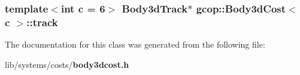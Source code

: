 \subsubsection[{track}]{\setlength{\rightskip}{0pt plus 5cm}template$<$int c = 6$>$ {\bf \-Body3d\-Track}$\ast$ {\bf gcop\-::\-Body3d\-Cost}$<$ c $>$\-::{\bf track}}\label{classgcop_1_1Body3dCost_abb852e8abe5fbe2ec179981ca765a786}


\-The documentation for this class was generated from the following file\-:\begin{DoxyCompactItemize}
\item 
lib/systems/costs/{\bf body3dcost.\-h}\end{DoxyCompactItemize}
